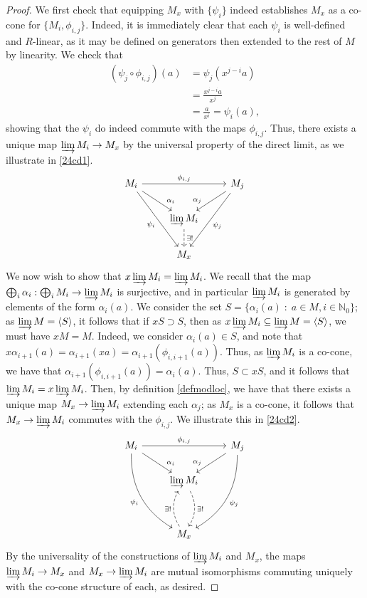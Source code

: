 \documentclass[english]{article}
\newcommand{\NN}{\mathbb{N}}
\theoremstyle{remark}
\theoremstyle{definition}
\newcommand{\colim}{\varinjlim}
\newcommand{\idl}[1]{\left\langle{#1}\right\rangle }
\begin{document}
\begin{proof}
We first check that equipping $M_x$ with $\{\psi_i\}$ indeed establishes $M_x$ as a co-cone for $\{M_i,\phi_{i,j}\}$. Indeed, it is immediately clear that each $\psi_i$ is well-defined and $R$-linear, as it may be defined on generators then extended to the rest of $M$ by linearity. We check that \begin{align*}
(\psi_j\circ\phi_{i,j})(a)&=\psi_j(x^{j-i}a)\\&=\frac{x^{j-i}a}{x^j}\\&=\frac{a}{x^i}=\psi_i(a),\end{align*} showing that the $\psi_i$ do indeed commute with the maps $\phi_{i,j}$. Thus, there exists a unique map $\colim M_i\to M_x$ by the universal property of the direct limit, as we illustrate in \eqref{24cd1}.
\begin{equation}
\label{24cd1} \begin{tikzcd}
M_i\arrow[rr,"\phi_{i,j}"]\arrow[dr,"\alpha_i", near end]\arrow[ddr,"\psi_i",swap]& &M_j\arrow[dl,"\alpha_j",swap,near end]\arrow[ddl,"\psi_j"]\\
&\colim M_i\arrow[d,dashrightarrow,"\exists!"]&\\
& M_x &
\end{tikzcd}
\end{equation} 
We now wish to show that $x\colim M_i=\colim M_i$. We recall that the map $\bigoplus_i \alpha_i:\bigoplus_i M_i\to \colim M_i$ is surjective, and in particular $\colim M_i$ is generated by elements of the form $\alpha_i(a)$. We consider the set $S=\{\alpha_i(a)\;:\;a\in M,i\in \NN_0\}$; as $\colim M=\idl{S}$, it follows that if $xS\supset S$, then as $x\colim M_i\subseteq\colim M=\idl{S}$, we must have $xM=M$. Indeed, we consider $\alpha_i(a)\in S$, and note that $x\alpha_{i+1}(a)=\alpha_{i+1}(xa)=\alpha_{i+1}(\phi_{i,i+1}(a))$. Thus, as $\colim M_i$ is a co-cone, we have that $\alpha_{i+1}(\phi_{i,i+1}(a))=\alpha_i(a)$. Thus, $S\subset xS$, and it follows that $\colim M_i=x\colim M_i$. Then, by definition \ref{defmodloc}, we have that there exists a unique map $M_x\to \colim M_i$ extending each $\alpha_j$; as $M_x$ is a co-cone, it follows that $M_x\to \colim M_i$ commutes with the $\phi_{i,j}$. We illustrate this in \eqref{24cd2}.
\begin{equation}
\label{24cd2}\begin{tikzcd}
M_i\arrow[rr,"\phi_{i,j}"]\arrow[dr,"\alpha_i", near end]\arrow[dddr,"\psi_i",swap,bend right]& &M_j\arrow[dl,"\alpha_j",swap,near end]\arrow[dddl,"\psi_j", bend left]\\
&\colim M_i\arrow[dd,dashrightarrow,"\exists!",bend left]&\\\\
& M_x \arrow[uu,dashrightarrow,"\exists!",bend left]&
\end{tikzcd}
\end{equation} 
By the universality of the constructions of $\colim M_i$ and $M_x$, the maps $\colim M_i\to M_x$ and $M_x\to \colim M_i$ are mutual isomorphisms commuting uniquely with the co-cone structure of each, as desired.
\end{proof}
\end{document}
